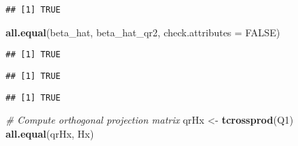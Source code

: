 \documentclass[]{book}
\newenvironment{Shaded}{\begin{snugshade}}{\end{snugshade}}
\newcommand{\CommentTok}[1]{\textcolor[rgb]{0.56,0.35,0.01}{\textit{#1}}}
\newcommand{\DataTypeTok}[1]{\textcolor[rgb]{0.13,0.29,0.53}{#1}}
\newcommand{\KeywordTok}[1]{\textcolor[rgb]{0.13,0.29,0.53}{\textbf{#1}}}
\newcommand{\NormalTok}[1]{#1}
\newcommand{\OperatorTok}[1]{\textcolor[rgb]{0.81,0.36,0.00}{\textbf{#1}}}
\newcommand{\OtherTok}[1]{\textcolor[rgb]{0.56,0.35,0.01}{#1}}
\newcommand{\StringTok}[1]{\textcolor[rgb]{0.31,0.60,0.02}{#1}}
\theoremstyle{definition}
\theoremstyle{definition}
\theoremstyle{definition}
\theoremstyle{remark}
\begin{document}
\begin{verbatim}
## [1] TRUE
\end{verbatim}

\begin{Shaded}
\begin{Highlighting}[]
\KeywordTok{all.equal}\NormalTok{(beta_hat, beta_hat_qr2, }\DataTypeTok{check.attributes =} \OtherTok{FALSE}\NormalTok{)}
\end{Highlighting}
\end{Shaded}

\begin{verbatim}
## [1] TRUE
\end{verbatim}

\begin{Shaded}
\end{Shaded}

\begin{verbatim}
## [1] TRUE
\end{verbatim}

\begin{Shaded}
\end{Shaded}

\begin{verbatim}
## [1] TRUE
\end{verbatim}

\begin{Shaded}
\begin{Highlighting}[]
\CommentTok{# Compute orthogonal projection matrix}
\NormalTok{qrHx <-}\StringTok{ }\KeywordTok{tcrossprod}\NormalTok{(Q1)}
\KeywordTok{all.equal}\NormalTok{(qrHx, Hx)}
\end{Highlighting}
\end{Shaded}
\end{document}
